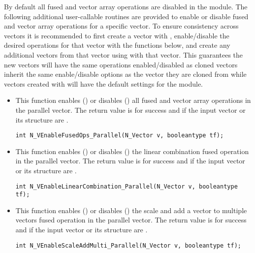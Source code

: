 By default all fused and vector array operations are disabled in the {\nvecp}
module. The following additional user-callable routines are provided to
enable or disable fused and vector array operations for a specific vector. To
ensure consistency across vectors it is recommended to first create a vector
with , enable/disable the desired operations for that vector
with the functions below, and create any additional vectors from that vector
using  with that vector. This guarantees the new vectors will
have the same operations enabled/disabled as cloned vectors inherit the same
enable/disable options as the vector they are cloned from while vectors created with
 will have the default settings for the {\nvecp} module.
\begin{itemize}


\item {}

This function enables () or disables () all fused and
vector array operations in the parallel vector. The return value is  for
success and  if the input vector or its  structure are .

\verb|int N_VEnableFusedOps_Parallel(N_Vector v, booleantype tf);|


\item {}

This function enables () or disables () the linear
combination fused operation in the parallel vector. The return value is  for
success and  if the input vector or its  structure are .

\verb|int N_VEnableLinearCombination_Parallel(N_Vector v, booleantype tf);|


\item {}

This function enables () or disables () the scale and
add a vector to multiple vectors fused operation in the parallel vector. The
return value is  for success and  if the input vector or its
 structure are .

\verb|int N_VEnableScaleAddMulti_Parallel(N_Vector v, booleantype tf);|


\end{itemize}
